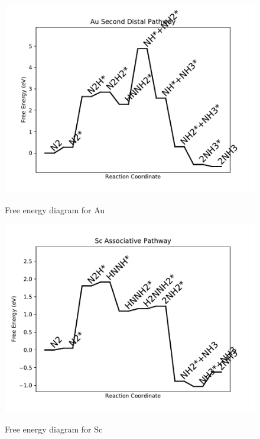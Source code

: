 \documentclass{article}
\begin{document}
\newpage
\begin{figure}
\includegraphics[width=1\linewidth]{data/plots/Au_distal_2.pdf}
\label{fig:Au_distal_2}
\caption{Free energy diagram for Au}
\end{figure}

\begin{figure}
\includegraphics[width=1\linewidth]{data/plots/Sc_associative.pdf}
\label{fig:Sc_associative}
\caption{Free energy diagram for Sc}
\end{figure}
\end{document}
